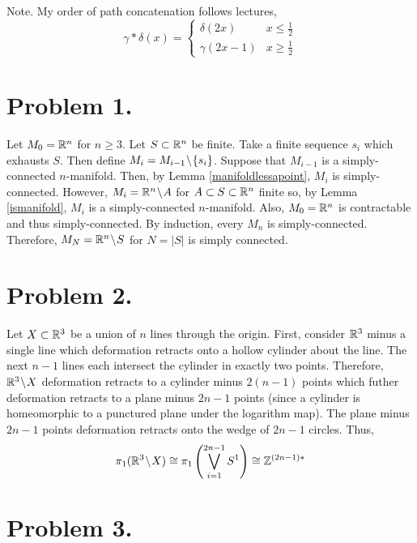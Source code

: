 \documentclass[12pt]{extarticle}
\begin{document}

Note. My order of path concatenation follows lectures,
\[\gamma * \delta(x) = \begin{cases}
\delta(2x) & x \le \tfrac{1}{2} \\
\gamma(2x - 1) & x \ge \tfrac{1}{2}
\end{cases}\]
 
\section*{Problem 1.}

Let $M_0 = \mathbb{R}^n$ for $n \ge 3$. Let $S \subset \mathbb{R}^n$ be finite. Take a finite sequence $s_i$ which exhausts $S$. Then define $M_{i} = M_{i - 1} \! \setminus \! \{s_i\}$. Suppose that $M_{i - 1}$ is a simply-connected $n$-manifold. Then, by Lemma \ref{manifoldlessapoint}, $M_i$ is simply-connected. However, $M_i = \mathbb{R}^n \! \setminus \! A$ for $A \subset S \subset \mathbb{R}^n$ finite so, by Lemma \ref{ismanifold}, $M_i$ is a simply-connected $n$-manifold. Also, $M_0 = \mathbb{R}^n$ is contractable and thus simply-connected. By induction, every $M_n$ is simply-connected. Therefore, $M_N = \mathbb{R}^n \! \setminus \! S$ for $N = |S|$ is simply connected.   

\section*{Problem 2.}

Let $X \subset \mathbb{R}^3$ be a union of $n$ lines through the origin. First, consider $\mathbb{R}^3$ minus a single line which deformation retracts onto a hollow cylinder about the line. The next $n - 1$ lines each intersect the cylinder in exactly two points. Therefore, $\mathbb{R}^3 \! \setminus \! X$ deformation retracts to a cylinder minus $2(n - 1)$ points which futher deformation retracts to a plane minus $2n - 1$ points (since a cylinder is homeomorphic to a punctured plane under the logarithm map). The plane minus $2n - 1$ points deformation retracts onto the wedge of $2n - 1$ circles. Thus, 
\[\pi_1(\mathbb{R}^3 \! \setminus \! X) \cong \pi_1\left( \bigvee\limits_{i = 1}^{2n - 1} S^1 \right) \cong \mathbb{Z}^{(2n - 1)*} \] 

\section*{Problem 3.}
\end{document}
